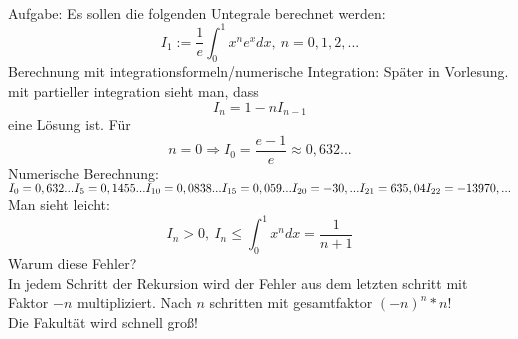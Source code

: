 \begin{example}\hfill\\
Aufgabe: Es sollen die folgenden Untegrale berechnet werden: $$I_1 := \frac{1}{e}\int^1_0 x^ne^x dx, \ n=0,1,2,...$$
Berechnung mit integrationsformeln/numerische Integration: Später in Vorlesung.\\
mit partieller integration sieht man, dass $$ I_n=1-nI_{n-1}$$
eine Lösung ist.
Für $$n=0 \Rightarrow I_0 = \frac{e-1}{e}\approx 0,632...$$
Numerische Berechnung: 
$I_0=0,632...\\
I_5= 0,1455...\\
I_{10}=0,0838...\\
I_{15}=0,059...\\
I_{20}=-30,...\\
I_{21}=635,04\\
I_{22}=-13970,...$\\
Man sieht leicht: $$I_n>0, \ I_n \leq \int^1_0x^ndx=\frac{1}{n+1}$$
Warum diese Fehler?\\
In jedem Schritt der Rekursion wird der Fehler aus dem letzten schritt mit Faktor $-n$ multipliziert. Nach $n$ schritten mit gesamtfaktor $(-n)^n*n!$\\
Die Fakultät wird schnell groß!
\end{example}
%